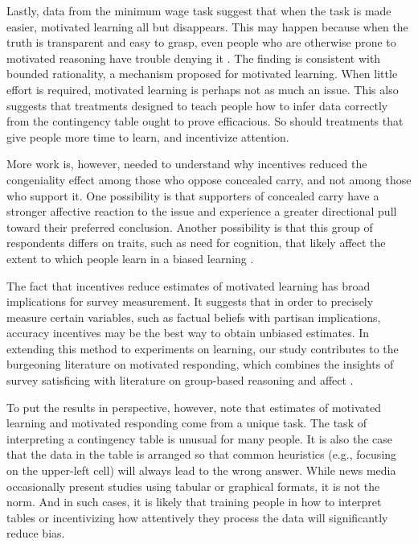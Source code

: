 \documentclass[12pt, letterpaper]{article}
\begin{document}
Lastly, data from the minimum wage task suggest that when the task is made easier, motivated learning all but disappears. This may happen because when the truth is transparent and easy to grasp, even people who are otherwise prone to motivated reasoning have trouble denying it \citep[see also][who shows that when economic conditions are unambiguous, as in the 2008 recession, factual beliefs about the economy converge]{bisgaard2015}. The finding is consistent with bounded rationality, a mechanism proposed for motivated learning. When little effort is required, motivated learning is perhaps not as much an issue. This also suggests that treatments designed to teach people how to infer data correctly from the contingency table ought to prove efficacious. So should treatments that give people more time to learn, and incentivize attention.

More work is, however, needed to understand why incentives reduced the congeniality effect among those who oppose concealed carry, and not among those who support it. One possibility is that supporters of concealed carry have a stronger affective reaction to the issue and experience a greater directional pull toward their preferred conclusion. Another possibility is that this group of respondents differs on traits, such as need for cognition, that likely affect the extent to which people learn in a biased learning \citep[e.g.,][]{arceneaux2013}.

The fact that incentives reduce estimates of motivated learning has broad implications for survey measurement. It suggests that in order to precisely measure certain variables, such as factual beliefs with partisan implications, accuracy incentives may be the best way to obtain unbiased estimates. In extending this method to experiments on learning, our study contributes to the burgeoning literature on motivated responding, which combines the insights of survey satisficing with literature on group-based reasoning and affect \citep{bullock2015, prior2015}. 

To put the results in perspective, however, note that estimates of motivated learning and motivated responding come from a unique task. The task of interpreting a contingency table is unusual for many people. It is also the case that the data in the table is arranged so that common heuristics (e.g., focusing on the upper-left cell) will always lead to the wrong answer. While news media occasionally present studies using tabular or graphical formats, it is not the norm. And in such cases, it is likely that training people in how to interpret tables or incentivizing how attentively they process the data will significantly reduce bias. 
\end{document}
